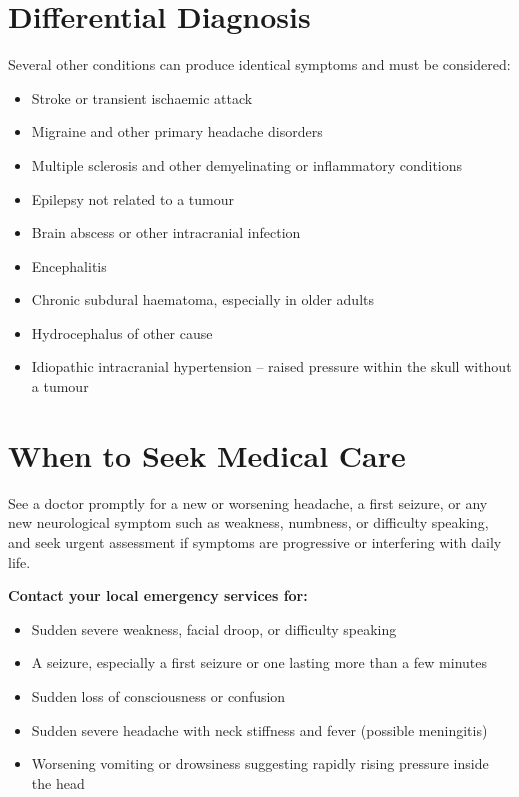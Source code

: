 \section*{Differential Diagnosis}
Several other conditions can produce identical symptoms and must be considered:

\begin{itemize}
    \item Stroke or transient ischaemic attack
    \item Migraine and other primary headache disorders
    \item Multiple sclerosis and other demyelinating or inflammatory conditions
    \item Epilepsy not related to a tumour
    \item Brain abscess or other intracranial infection
    \item Encephalitis
    \item Chronic subdural haematoma, especially in older adults
    \item Hydrocephalus of other cause
    \item Idiopathic intracranial hypertension -- raised pressure within the skull without a tumour
\end{itemize}

\section*{When to Seek Medical Care}
See a doctor promptly for a new or worsening headache, a first seizure, or any new neurological symptom such as weakness, numbness, or difficulty speaking, and seek urgent assessment if symptoms are progressive or interfering with daily life.

\textbf{Contact your local emergency services for:}
\begin{itemize}
    \item Sudden severe weakness, facial droop, or difficulty speaking
    \item A seizure, especially a first seizure or one lasting more than a few minutes
    \item Sudden loss of consciousness or confusion
    \item Sudden severe headache with neck stiffness and fever (possible meningitis)
    \item Worsening vomiting or drowsiness suggesting rapidly rising pressure inside the head
\end{itemize}

